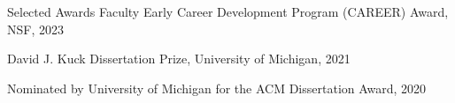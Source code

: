 \begin{rSection}{Selected Awards}
Faculty Early Career Development Program (CAREER) Award, NSF, 2023

David J. Kuck Dissertation Prize, University of Michigan, 2021

Nominated by University of Michigan for the ACM Dissertation Award, 2020





\end{rSection}